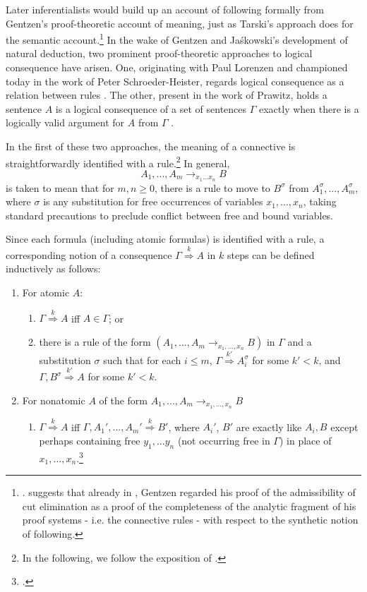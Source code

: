 	Later inferentialists would build up an account of following formally from Gentzen's proof-theoretic account of meaning, just as Tarski's approach does for the semantic account.\footnote{\cite[159]{Prawitz1985}. \cite[366-376]{Franks2010} suggests that already in \cite{Gentzen1934}, Gentzen regarded his proof of the admissibility of cut elimination as a proof of the completeness of the analytic fragment of his proof systems - i.e. the connective rules - with respect to the synthetic notion of following.} In the wake of Gentzen and Ja\'{s}kowski's development of natural deduction, two prominent proof-theoretic approaches to logical consequence have arisen. One, originating with Paul Lorenzen and championed today in the work of Peter Schroeder-Heister, regards logical consequence as a relation between rules \cite{Lorenzen1955} \cite{Schroeder-Heister1984} \cite{Schroeder-Heister2006} \cite{Schroeder-Heister2014}. The other, present in the work of Prawitz, holds a sentence $A$ is a logical consequence of a set of sentences $\Gamma$ exactly when there is a logically valid argument for $A$ from $\Gamma$ \cite{Prawitz1974} \cite{Prawitz1985}.
	
	In the first of these two approaches, the meaning of a connective is straightforwardly identified with a rule.\footnote{In the following, we follow the exposition of \cite[155-159]{Prawitz1985}.} In general, \[A_{1},...,A_{m} \longrightarrow_{x_{1}...x_{n}} B\] is taken to mean that for $m, n \geq 0$, there is a rule to move to $B^{\sigma}$ from $A^{\sigma}_{1},..., A^{\sigma}_{m}$, where $\sigma$ is any substitution for free occurrences of variables $x_1, ... , x_{n}$, taking standard precautions to preclude conflict between free and bound variables.
	
	Since each formula (including atomic formulas) is identified with a rule, a corresponding notion of a consequence $\Gamma \stackrel{k}{\Rightarrow} A$ in $k$ steps can be defined inductively as follows: 
	\begin{enumerate}
		\item For atomic $A$:
		\begin{enumerate}
			\item $\Gamma \stackrel{k}{\Rightarrow} A$ iff $A \in \Gamma$; or
			\item there is a rule of the form $(A_{1}, ... , A_{m} \longrightarrow_{x_{1}, ... , x_{n}} B)$ in $\Gamma$ and a substitution $\sigma$ such that for each $i\leq m$, $\Gamma \stackrel{k'}{\Rightarrow} A^{\sigma}_{i}$ for some $k' < k$, and $\Gamma, B^{\sigma}\stackrel{k'}{\Rightarrow} A$ for some $k'< k$.
		\end{enumerate}
		\item For nonatomic $A$ of the form $A_{1},...,A_{m}\longrightarrow_{x_{1},...,x_{n}} B$
		\begin{enumerate}
			\item$\Gamma \stackrel{k}{\Rightarrow} A$ iff $\Gamma, A_{1}',...,A_{m}' \stackrel{k}{\Rightarrow} B'$, where $A_{i}'$, $B'$ are exactly like $A_{i}, B$ except perhaps containing free $y_{1},...y_{n}$ (not occurring free in $\Gamma$) in place of $x_{1},...,x_{n}$.\footnote{\cite[156]{Prawitz1985}.}
		\end{enumerate}
	\end{enumerate}
	
